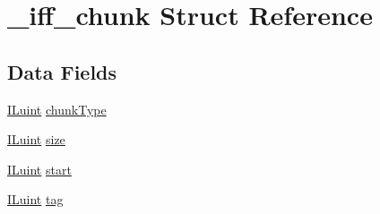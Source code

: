 \hypertarget{struct__iff__chunk}{\section{\-\_\-iff\-\_\-chunk Struct Reference}
\label{struct__iff__chunk}
}
\subsection*{Data Fields}
\begin{DoxyCompactItemize}
\item 
\hyperlink{il_8h_ac6508d0e9c19e32f32e00d54b5b8cf30}{I\-Luint} \hyperlink{struct__iff__chunk_ab66d2ac3de08ec1f806d142dded70c5e}{chunk\-Type}
\item 
\hyperlink{il_8h_ac6508d0e9c19e32f32e00d54b5b8cf30}{I\-Luint} \hyperlink{struct__iff__chunk_ae9842d9af0c4b351729c2a3a5be087a6}{size}
\item 
\hyperlink{il_8h_ac6508d0e9c19e32f32e00d54b5b8cf30}{I\-Luint} \hyperlink{struct__iff__chunk_a6828124a46d2f49a09e1f2cbda556a8a}{start}
\item 
\hyperlink{il_8h_ac6508d0e9c19e32f32e00d54b5b8cf30}{I\-Luint} \hyperlink{struct__iff__chunk_a17d9abf60583db274749d9f754585197}{tag}
\end{DoxyCompactItemize}


